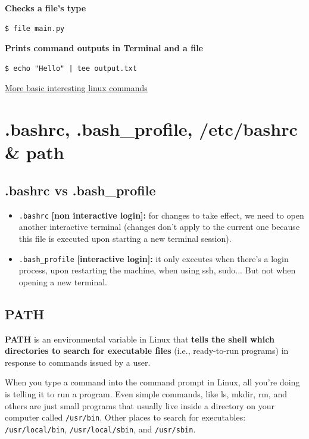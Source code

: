 \documentclass{article}
\newenvironment{codetemplate}[1][]{%
  \mybasecolorbox[#1]
  \itshape
}{%
  \endmybasecolorbox
}
\begin{document}
\textbf{Checks a file's type}
\begin{codetemplate}{}
\begin{verbatim}
$ file main.py
\end{verbatim}
\end{codetemplate}

\textbf{Prints command outputs in Terminal and a file}
\begin{codetemplate}{}
\begin{verbatim}
$ echo "Hello" | tee output.txt
\end{verbatim}
\end{codetemplate}

\href{https://www.hostinger.com/tutorials/linux-commands}{More basic interesting linux commands}

\newpage
\section{.bashrc, .bash\_profile, /etc/bashrc \& path}

\subsection{.bashrc vs .bash\_profile}

\begin{itemize}
    \item \verb|.bashrc| \textbf{[non interactive login]:} for changes to take effect, we need to open another interactive terminal (changes don't apply to the current one because this file is executed upon starting a new terminal session).
    \item \verb|.bash_profile| \textbf{[interactive login]:} it only executes when there's a login process, upon restarting the machine, when using ssh, sudo... But not when opening a new terminal.
\end{itemize}

\subsection{PATH}
\textbf{PATH} is an environmental variable in Linux that \textbf{tells the shell which directories to search for executable files} (i.e., ready-to-run programs) in response to commands issued by a user.

When you type a command into the command prompt in Linux, all you're doing is telling it to run a program. Even simple commands, like ls, mkdir, rm, and others are just small programs that usually live inside a directory on your computer called \verb|/usr/bin|. Other places to search for executables: \verb+/usr/local/bin+, \verb+/usr/local/sbin+, and \verb+/usr/sbin+. 
\end{document}

